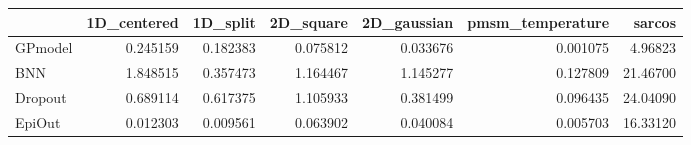 \begin{tabular}{lrrrrrr}
\toprule
{} &  1D\_centered &  1D\_split &  2D\_square &  2D\_gaussian &  pmsm\_temperature &    sarcos \\
\midrule
GPmodel &     0.245159 &  0.182383 &   0.075812 &     0.033676 &          0.001075 &   4.96823 \\
BNN     &     1.848515 &  0.357473 &   1.164467 &     1.145277 &          0.127809 &  21.46700 \\
Dropout &     0.689114 &  0.617375 &   1.105933 &     0.381499 &          0.096435 &  24.04090 \\
EpiOut  &     0.012303 &  0.009561 &   0.063902 &     0.040084 &          0.005703 &  16.33120 \\
\bottomrule
\end{tabular}
